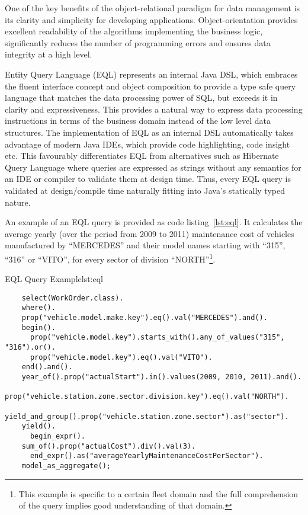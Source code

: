   One of the key benefits of the object-relational paradigm for data management is its clarity and simplicity for developing applications.
  Object-orientation provides excellent readability of the algorithms implementing the business logic, significantly reduces the number of programming errors and ensures data integrity at a high level.
  
  Entity Query Language (EQL) represents an internal Java DSL, which embraces the fluent interface concept and object composition to provide a type safe query language that matches the data processing power of SQL, but exceeds it in clarity and expressiveness.
  This provides a natural way to express data processing instructions in terms of the business domain instead of the low level data structures.
  The implementation of EQL as an internal DSL automatically takes advantage of modern Java IDEs, which provide code highlighting, code insight etc.
  This favourably differentiates EQL from alternatives such as Hibernate Query Language where queries are expressed as strings without any semantics for an IDE or compiler to validate them at design time.
  Thus, every EQL query is validated at design/compile time naturally fitting into Java's statically typed nature.
  
  An example of an EQL query is provided as code listing~\ref{lst:eql}.  
  It calculates the average yearly (over the period from 2009 to 2011) maintenance cost of vehicles manufactured by ``MERCEDES'' and their model names starting with ``315'', ``316'' or ``VITO'', for every sector of division ``NORTH''\footnote{This example is specific to a certain fleet domain and the full comprehension of the query implies good understanding of that domain.}.  

  \begin{code}{EQL Query Example}{lst:eql}
  \begin{lstlisting}
    select(WorkOrder.class).
    where().
    prop("vehicle.model.make.key").eq().val("MERCEDES").and().
    begin().
      prop("vehicle.model.key").starts_with().any_of_values("315", "316").or().
      prop("vehicle.model.key").eq().val("VITO").
    end().and().
    year_of().prop("actualStart").in().values(2009, 2010, 2011).and().
    prop("vehicle.station.zone.sector.division.key").eq().val("NORTH").
    yield_and_group().prop("vehicle.station.zone.sector").as("sector").
    yield().
      begin_expr().
	sum_of().prop("actualCost").div().val(3).
      end_expr().as("averageYearlyMaintenanceCostPerSector").
    model_as_aggregate();
  \end{lstlisting}
  \end{code}
  
